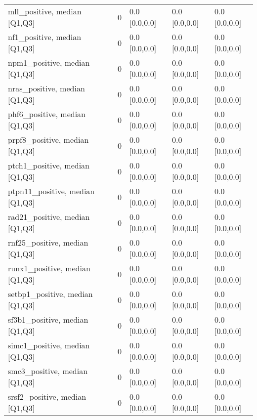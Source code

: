 \begin{tabular}{llllll}
mll\_positive, median [Q1,Q3] &     &                    0 &       0.0 [0.0,0.0] &       0.0 [0.0,0.0] &     0.0 [0.0,0.0] \\
nf1\_positive, median [Q1,Q3] &     &                    0 &       0.0 [0.0,0.0] &       0.0 [0.0,0.0] &     0.0 [0.0,0.0] \\
npm1\_positive, median [Q1,Q3] &     &                    0 &       0.0 [0.0,0.0] &       0.0 [0.0,0.0] &     0.0 [0.0,0.0] \\
nras\_positive, median [Q1,Q3] &     &                    0 &       0.0 [0.0,0.0] &       0.0 [0.0,0.0] &     0.0 [0.0,0.0] \\
phf6\_positive, median [Q1,Q3] &     &                    0 &       0.0 [0.0,0.0] &       0.0 [0.0,0.0] &     0.0 [0.0,0.0] \\
prpf8\_positive, median [Q1,Q3] &     &                    0 &       0.0 [0.0,0.0] &       0.0 [0.0,0.0] &     0.0 [0.0,0.0] \\
ptch1\_positive, median [Q1,Q3] &     &                    0 &       0.0 [0.0,0.0] &       0.0 [0.0,0.0] &     0.0 [0.0,0.0] \\
ptpn11\_positive, median [Q1,Q3] &     &                    0 &       0.0 [0.0,0.0] &       0.0 [0.0,0.0] &     0.0 [0.0,0.0] \\
rad21\_positive, median [Q1,Q3] &     &                    0 &       0.0 [0.0,0.0] &       0.0 [0.0,0.0] &     0.0 [0.0,0.0] \\
rnf25\_positive, median [Q1,Q3] &     &                    0 &       0.0 [0.0,0.0] &       0.0 [0.0,0.0] &     0.0 [0.0,0.0] \\
runx1\_positive, median [Q1,Q3] &     &                    0 &       0.0 [0.0,0.0] &       0.0 [0.0,0.0] &     0.0 [0.0,0.0] \\
setbp1\_positive, median [Q1,Q3] &     &                    0 &       0.0 [0.0,0.0] &       0.0 [0.0,0.0] &     0.0 [0.0,0.0] \\
sf3b1\_positive, median [Q1,Q3] &     &                    0 &       0.0 [0.0,0.0] &       0.0 [0.0,0.0] &     0.0 [0.0,0.0] \\
simc1\_positive, median [Q1,Q3] &     &                    0 &       0.0 [0.0,0.0] &       0.0 [0.0,0.0] &     0.0 [0.0,0.0] \\
smc3\_positive, median [Q1,Q3] &     &                    0 &       0.0 [0.0,0.0] &       0.0 [0.0,0.0] &     0.0 [0.0,0.0] \\
srsf2\_positive, median [Q1,Q3] &     &                    0 &       0.0 [0.0,0.0] &       0.0 [0.0,0.0] &     0.0 [0.0,0.0] \\

\end{tabular}
